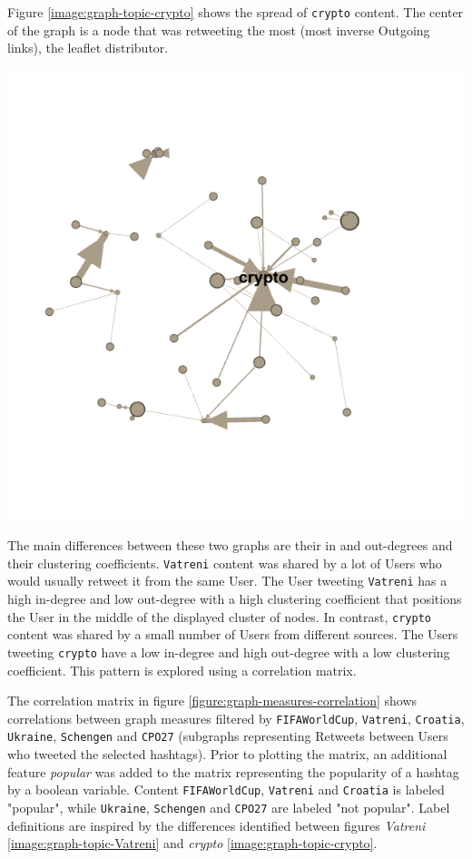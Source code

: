 \clearpage
Figure \ref{image:graph-topic-crypto} shows the spread of \texttt{crypto} content. The center of the graph is a node that was retweeting the most (most inverse Outgoing links), the leaflet distributor.

\begin{center}
\includegraphics[width=16cm,keepaspectratio]{images/graph-topic-crypto.png}
\label{image:graph-topic-crypto}
\end{center}

The main differences between these two graphs are their in and out-degrees and their clustering coefficients. \texttt{Vatreni} content was shared by a lot of Users who would usually retweet it from the same User. The User tweeting \texttt{Vatreni} has a high in-degree and low out-degree with a high clustering coefficient that positions the User in the middle of the displayed cluster of nodes. In contrast, \texttt{crypto} content was shared by a small number of Users from different sources. The Users tweeting \texttt{crypto} have a low in-degree and high out-degree with a low clustering coefficient. This pattern is explored using a correlation matrix.

The correlation matrix in figure \ref{figure:graph-measures-correlation} shows correlations between graph measures filtered by \texttt{FIFAWorldCup}, \texttt{Vatreni}, \texttt{Croatia}, \texttt{Ukraine}, \texttt{Schengen} and \texttt{CPO27} (subgraphs representing Retweets between Users who tweeted the selected hashtags). Prior to plotting the matrix, an additional feature \textit{popular} was added to the matrix representing the popularity of a hashtag by a boolean variable. Content \texttt{FIFAWorldCup}, \texttt{Vatreni} and \texttt{Croatia} is labeled "popular", while \texttt{Ukraine}, \texttt{Schengen} and \texttt{CPO27} are labeled "not popular". Label definitions are inspired by the differences identified between figures \textit{Vatreni} \ref{image:graph-topic-Vatreni} and \textit{crypto} \ref{image:graph-topic-crypto}.


